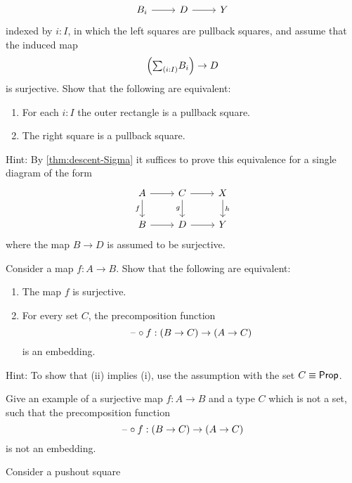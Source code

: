 \begin{exercises}
\begin{equation*}
\begin{tikzcd}
      B_i \arrow[r] & D \arrow[r] & Y 
    \end{tikzcd}
  \end{equation*}
  indexed by $i:I$, in which the left squares are pullback squares,
  and assume that the induced map
  \begin{equation*}
    \Big(\sm{i:I}B_i\Big)\to D
  \end{equation*}
  is surjective. Show that the following are equivalent:
  \begin{enumerate}
  \item For each $i:I$ the outer rectangle is a pullback square.
  \item The right square is a pullback square.
  \end{enumerate}
  Hint: By \cref{thm:descent-Sigma} it suffices to prove this equivalence for a single diagram of the form
  \begin{equation*}
    \begin{tikzcd}
      A \arrow[r] \arrow[d,swap,"{f}"] &
      C \arrow[r] \arrow[d,swap,"g"] & X \arrow[d,"h"] \\
      B \arrow[r] & D \arrow[r] & Y 
    \end{tikzcd}
  \end{equation*}
  where the map $B \to D$ is assumed to be surjective.
  \exercise
  \begin{subexenum}
  \item \label{ex:surjective-precomp}Consider a map $f:A\to B$. Show that the following are equivalent:
    \begin{enumerate}
      \item The map $f$ is surjective.
      \item For every set $C$, the precomposition function
        \begin{equation*}
          \mathord{\hspace{1pt}\text{--}\hspace{1pt}}\circ f:(B\to C)\to (A\to C)
        \end{equation*}
        is an embedding.
    \end{enumerate}
    Hint: To show that (ii) implies (i), use the assumption with the set $C\equiv\mathsf{Prop}$.
  \item Give an example of a surjective map $f:A\to B$ and a type $C$ which is not a set, such that the precomposition function
    \begin{equation*}
      \mathord{\hspace{1pt}\text{--}\hspace{1pt}}\circ f:(B\to C)\to (A\to C)
    \end{equation*}
    is not an embedding.
  \end{subexenum}
  \exercise Consider a pushout square

\end{exercises}
